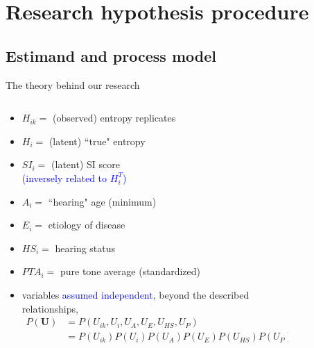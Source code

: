 \section{Research hypothesis procedure}
%
%
\subsection{Estimand and process model}
%
%
\begin{frame}[t, negative]
	\subsectionpage
\end{frame}
%
%
\begin{frame}
	{The theory behind our research}
	\begin{columns}
		\begin{column}{0.5\textwidth}
			\begin{itemize}
				\item $H_{ik}=$ (observed) entropy replicates
				\item $H_{i}=$ (latent) ``true" entropy
				\item $SI_{i}=$ (latent) SI score \\
				{\small \textcolor{blue}{(inversely related to $H^{T}_{i}$)} }
				\item $A_{i}=$ ``hearing" age (minimum)
				\item $E_{i}=$ etiology of disease
				\item $HS_{i}=$ hearing status
				\item $PTA_{i}=$ pure tone average (standardized)
				\item variables \textcolor{blue}{assumed independent}, beyond the described relationships,
				\begin{equation*}
					\begin{aligned} 
						P(\pmb{U}) & = P(U_{ik}, U_{i}, U_{A}, U_{E}, U_{HS}, U_{P}) \\ 
						& = P(U_{ik}) P(U_{i}) P(U_{A}) P(U_{E}) P(U_{HS}) P(U_{P})
					\end{aligned}
				\end{equation*}
			\end{itemize}
		\end{column}
		\begin{column}{0.5\textwidth}  
			\begin{figure}
\end{figure}
\end{column}
\end{columns}
\end{frame}
